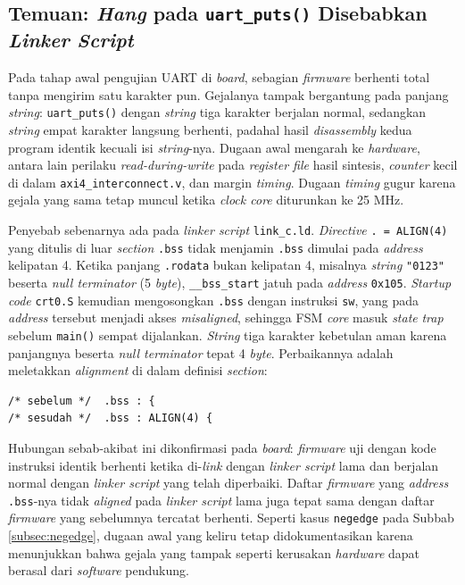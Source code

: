 \subsection{Temuan: \textit{Hang} pada \texttt{uart\_puts()} Disebabkan \textit{Linker Script}}
\label{subsec:bss-align}

Pada tahap awal pengujian UART di \textit{board}, sebagian \textit{firmware} berhenti total tanpa mengirim satu karakter pun. Gejalanya tampak bergantung pada panjang \textit{string}: \texttt{uart\_puts()} dengan \textit{string} tiga karakter berjalan normal, sedangkan \textit{string} empat karakter langsung berhenti, padahal hasil \textit{disassembly} kedua program identik kecuali isi \textit{string}-nya. Dugaan awal mengarah ke \textit{hardware}, antara lain perilaku \textit{read-during-write} pada \textit{register file} hasil sintesis, \textit{counter} kecil di dalam \texttt{axi4\_interconnect.v}, dan margin \textit{timing}. Dugaan \textit{timing} gugur karena gejala yang sama tetap muncul ketika \textit{clock core} diturunkan ke 25 MHz.

Penyebab sebenarnya ada pada \textit{linker script} \texttt{link\_c.ld}. \textit{Directive} \texttt{. = ALIGN(4)} yang ditulis di luar \textit{section} \texttt{.bss} tidak menjamin \texttt{.bss} dimulai pada \textit{address} kelipatan 4. Ketika panjang \texttt{.rodata} bukan kelipatan 4, misalnya \textit{string} \texttt{"0123"} beserta \textit{null terminator} (5 \textit{byte}), \texttt{\_\_bss\_start} jatuh pada \textit{address} \texttt{0x105}. \textit{Startup code} \texttt{crt0.S} kemudian mengosongkan \texttt{.bss} dengan instruksi \texttt{sw}, yang pada \textit{address} tersebut menjadi akses \textit{misaligned}, sehingga FSM \textit{core} masuk \textit{state} \textit{trap} sebelum \texttt{main()} sempat dijalankan. \textit{String} tiga karakter kebetulan aman karena panjangnya beserta \textit{null terminator} tepat 4 \textit{byte}. Perbaikannya adalah meletakkan \textit{alignment} di dalam definisi \textit{section}:

\begin{lstlisting}
/* sebelum */  .bss : {
/* sesudah */  .bss : ALIGN(4) {
\end{lstlisting}

Hubungan sebab-akibat ini dikonfirmasi pada \textit{board}: \textit{firmware} uji dengan kode instruksi identik berhenti ketika di-\textit{link} dengan \textit{linker script} lama dan berjalan normal dengan \textit{linker script} yang telah diperbaiki. Daftar \textit{firmware} yang \textit{address} \texttt{.bss}-nya tidak \textit{aligned} pada \textit{linker script} lama juga tepat sama dengan daftar \textit{firmware} yang sebelumnya tercatat berhenti. Seperti kasus \texttt{negedge} pada Subbab \ref{subsec:negedge}, dugaan awal yang keliru tetap didokumentasikan karena menunjukkan bahwa gejala yang tampak seperti kerusakan \textit{hardware} dapat berasal dari \textit{software} pendukung.

